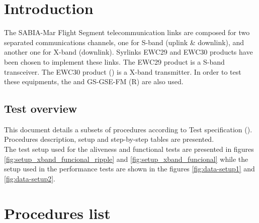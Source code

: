 \section{Introduction} \label{sec:int}


\newcommand{\TestPerfSetup}{Setup and configuration}
\newcommand{\TestPerfRFPXA}{Spectrum, power and BW with PXA}
\newcommand{\TestPerfCCDF}{CCDF measurement}
\newcommand{\TestPerfFreqS}{Frequency Stability}
\newcommand{\TestPerfCWPhaseN}{Carrier Phase Noise}
\newcommand{\TestPerfSpuriousDSN}{Spurious in DSN Band}
\newcommand{\TestPerfFilterVector}{Optimum filter confirmation And RF characterization with VSA and Cortex}
\newcommand{\TestPerfBer}{BER measurement}
\newcommand{\TestPerfSetupBreak}{Tests setup break}

The SABIA-Mar Flight Segment telecommunication links are composed for two separated
communications channels, one for S-band (uplink \& downlink), and another one for X-band
(downlink).\newline
Syrlinks EWC29 and EWC30 products have been chosen to implement these links.
The EWC29 product is a S-band transceiver. The EWC30 product () is a X-band transmitter. 
In order to test these equipments, the \comEgse\xspace and GS-GSE-FM (R) are also used.

\subsection{Test overview}

This document details a subsets of procedures according to Test specification ().
Procedures description, setup and step-by-step tables are presented.\\

The test setup used for the aliveness and functional tests are presented in figures \ref{fig:setup_xband_funcional_ripple} and \ref{fig:setup_xband_funcional} while
 the setup used in the performance tests are shown in the figures \ref{fig:data-setup1} and \ref{fig:data-setup2}.

\newpage
\section{Procedures list} \label{an:proc-list}

